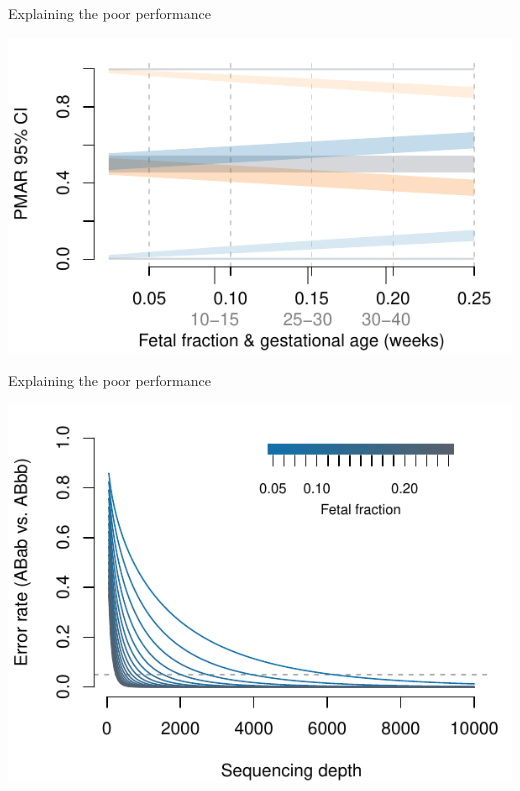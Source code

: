 \documentclass[
  10pt,
  ignorenonframetext,
  m]{beamer}
\begin{document}
\begin{frame}{Explaining the poor performance}
\protect\hypertarget{explaining-the-poor-performance}{}

\begin{center}\includegraphics{defense_files/figure-beamer/binCI-1} \end{center}

\end{frame}

\begin{frame}{Explaining the poor performance}
\protect\hypertarget{explaining-the-poor-performance-1}{}

\begin{center}\includegraphics{defense_files/figure-beamer/binWeitz-1} \end{center}

\end{frame}
\end{document}
